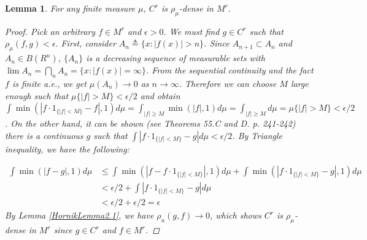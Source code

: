 \documentclass[12pt]{amsart}
\theoremstyle{plain}
\newtheorem{lemma}[thm]{Lemma}
\theoremstyle{definition}
\theoremstyle{remark}
\numberwithin{equation}{section}
\numberwithin{thm}{section}
\begin{document}
\begin{lemma} \label{HornikLemmaA1}
    For any finite measure $\mu$, $C^r$ is $\rho_\mu$-dense in $M^r$.
    \begin{proof}

 Pick an arbitrary $f \in M^r$ and $\epsilon > 0$. We must find $g \in C^r$ such that $\rho_\mu(f,g) < \epsilon.$ First, consider $A_n \triangleq \{ x : |f(x)| > n \}$. Since $A_{n+1} \subset A_n$ and $A_n \in B(R^n)$, $\{A_n\}$ is a decreasing sequence of measurable sets with $\lim A_n = \bigcap_n A_n = \{ x: |f(x)| = \infty \}$. From the sequential continuity and the fact $f$  is finite a.e., we get $\mu(A_n) \to 0$ as $n \to \infty$. Therefore we can choose $M$ large enough such that $\mu\{ |f| > M \} < \epsilon/2$ and obtain $\int \min(|f\cdot 1_{\{|f|<M\}}-f|, 1)d\mu = \int_{|f| \geq M} \min(|f|,1) d\mu = \int_{|f| \geq M} d\mu = \mu\{ |f| > M \} < \epsilon/2$. On the other hand, it can be shown (see \cite{Halmos} Theorems 55.C and D. p. 241-242) there is a continuous $g$ such that $\int |f\cdot 1_{\{|f|<M\}}-g|d\mu < \epsilon/2$. By Triangle inequality, we have the following:
 
 \begin{equation}
     \begin{aligned}
         \int \min (|f-g|,1) d\mu & \leq \int \min (|f-f\cdot 1_{\{|f|<M\}}|,1) d\mu +  \int \min( |f\cdot 1_{\{|f|<M\}}-g|,1)d\mu \\
         & < \epsilon/2 + \int |f\cdot 1_{\{|f|<M\}}-g| d\mu \\
         & < \epsilon/2 + \epsilon/2 = \epsilon
     \end{aligned}
 \end{equation}
    By Lemma \ref{HornikLemma2.1}, we have $\rho_u(g,f) \to 0$, which shows $C^r$ is $\rho_\mu$-dense in $M^r$ since $g \in C^r$ and $f \in M^r$.  
    \end{proof}

\end{lemma}
\end{document}
